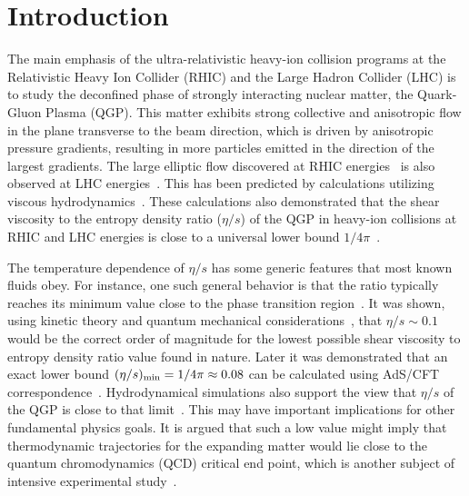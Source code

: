 
\section{Introduction}


The main emphasis of the ultra-relativistic heavy-ion collision programs at the Relativistic Heavy Ion Collider (RHIC) and the Large Hadron Collider (LHC) is to study the deconfined phase of strongly interacting nuclear matter, the Quark-Gluon Plasma (QGP). 
This matter exhibits strong collective and anisotropic flow in the plane transverse to the beam direction, which is driven by anisotropic pressure gradients, resulting in more particles emitted in the direction of the largest gradients.
The large elliptic flow discovered at RHIC energies~\cite{Ackermann:2000tr} is also observed at LHC energies~\cite{Aamodt:2010pa,Adam:2016izf}. This has been predicted by calculations utilizing viscous hydrodynamics~\cite{Romatschke:2007mq,Shen:2011eg,Schenke:2011zz,Bozek:2012qs,Gale:2012rq,Hirano:2010je}.
These calculations also demonstrated that the shear viscosity to the entropy density ratio ($\eta/s$) of the QGP in heavy-ion collisions at RHIC and LHC energies is close to a universal lower bound $1/4\pi$~\cite{Kovtun:2004de}.

The temperature dependence of $\eta/s$ has some generic features that most known fluids obey. For instance, one such general behavior is that the ratio typically reaches its minimum value close to the phase transition region~\cite{Lacey:2006bc}. 
It was shown, using kinetic theory and quantum mechanical considerations~\cite{PhysRevD.31.53}, that $\eta/s\sim0.1$ would be the correct order of magnitude for the lowest possible shear viscosity to entropy density ratio value found in nature. Later it was demonstrated that an exact lower bound $(\eta/s)_{\rm min}=1/4\pi\approx0.08$ can be calculated using AdS/CFT correspondence~\cite{Kovtun:2004de}. Hydrodynamical simulations also support the view that $\eta/s$ of the QGP is close to that limit~\cite{Gale:2012rq}. This may have important implications for other fundamental physics goals. It is argued that such a low value might imply that thermodynamic trajectories for the expanding matter would lie close to the quantum chromodynamics (QCD) critical end point, which is another subject of intensive experimental study~\cite{Lacey:2006bc,Csernai:2006zz}.

